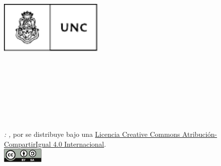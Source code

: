 \begin{titlepage}
    \begin{addmargin}[-1cm]{-3cm}
    \begin{center}
        \Large

        \hfill

        \bigskip
        \bigskip

        \spacedallcaps{\myUni} \\ \medskip
        \Large
        \myFaculty \\ \bigskip \bigskip
        \includegraphics[width=5cm]{gfx/unc_logo} \\ \bigskip

        \vfill

        \LARGE

        \begingroup
            \color{CTtitle}\spacedallcaps{\myTitle} \\ \medskip
        \endgroup

        \LARGE

        \spacedlowsmallcaps{\myName} \\ \bigskip
         \\
        \spacedlowsmallcaps{\mySupervisor} \\

        \vfill

        \Large

        \spacedlowsmallcaps{\myDegree} \\ \bigskip
        \myTime

        \vfill

    \end{center}

    \noindent\textit{\myTitle: \mySubtitle,} por \myName se distribuye bajo una \href{http://creativecommons.org/licenses/by-sa/4.0/}{Licencia Creative Commons Atribución-CompartirIgual 4.0 Internacional}. \vspace{0.3cm} \\
    \noindent\href{http://creativecommons.org/licenses/by-sa/4.0/}{\includegraphics[width=2cm]{gfx/by-sa}}

    \vfill
  \end{addmargin}
\end{titlepage}
